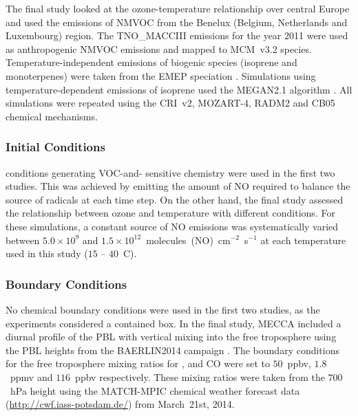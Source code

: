 The final study looked at the ozone-temperature relationship over central Europe and used the emissions of NMVOC from the Benelux (Belgium, Netherlands and Luxembourg) region.
The TNO\_MACCIII emissions for the year 2011 were used as anthropogenic NMVOC emissions and mapped to MCM~v3.2 species.
Temperature-independent emissions of biogenic species (isoprene and monoterpenes) were taken from the EMEP speciation \citep{Simpson:2012}.
Simulations using temperature-dependent emissions of isoprene used the MEGAN2.1 algorithm \citep{Guenther:2012}.
All simulations were repeated using the CRI~v2, MOZART-4, RADM2 and CB05 chemical mechanisms.

\vspace{-1mm}
\subsubsection{ Initial Conditions} 
 conditions generating VOC-and- sensitive chemistry were used in the first two studies.
This was achieved by emitting the amount of NO required to balance the source of radicals at each time step.
On the other hand, the final study assessed the relationship between ozone and temperature with different  conditions.
For these simulations, a constant source of NO emissions was systematically varied between $5.0 \times 10^9$ and $1.5 \times 10^{12}$~molecules~(NO)~cm$^{-2}$~s$^{-1}$ at each temperature used in this study ($15$ -- $40$~\degree C).

\newpage
\subsubsection{Boundary Conditions} 
No chemical boundary conditions were used in the first two studies, as the experiments considered a contained box.
In the final study, MECCA included a diurnal profile of the PBL with vertical mixing into the free troposphere using the PBL heights from the BAERLIN2014 campaign \citep{Bonn:2016}.
The boundary conditions for the free troposphere mixing ratios for ,  and CO were set to $50$~ppbv, $1.8$~ppmv and $116$~ppbv respectively. 
These mixing ratios were taken from the $700$~hPa height using the MATCH-MPIC chemical weather forecast data (\url{http://cwf.iass-potsdam.de/}) from March~21st, 2014.
